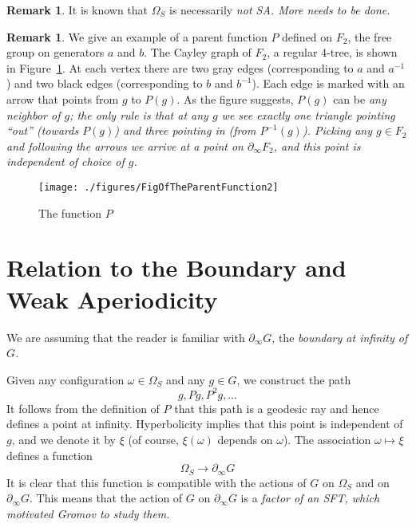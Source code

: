 \documentclass[12pt,reqno]{amsart}
\theoremstyle{plain}
\theoremstyle{definition}
\numberwithin{subcase}{case}
\theoremstyle{plain}
\theoremstyle{definition}
\newtheorem{remark}[thm]{Remark}
\begin{document}
\begin{remark}
\label{remark_notSA}
It is known that \(\Omega_{S}\) is necessarily \em not \em SA. More needs to be done.
\end{remark}


\begin{remark}
We give an example of a parent function \(P\) defined on \(F_{2}\), the free group on  generators \(a\) and \(b\). The Cayley graph of \(F_{2}\), a regular 4-tree, is shown in Figure~\ref{figure:papas}. 
At each vertex there are two gray edges (corresponding to \(a\) and \(a^{-1}\)) and  two black edges (corresponding to \(b\) and \(b^{-1}\)). Each edge is marked with an arrow that points from \(g\) to \(P(g)\).
As the figure suggests, \(P(g)\) can be \em any \em neighbor of \(g\); the only rule is that at any \(g\) we see exactly one triangle pointing ``out'' (towards \(P(g)\)) and three pointing in (from \(P^{-1}(g)\)). Picking any \(g \in F_{2}\) and following the arrows we arrive at a point on \(\partial_{\infty} F_{2}\), and this point is independent of choice of \(g\). 
\begin{figure}
\centerline{{\texttt{[image: ./figures/FigOfTheParentFunction2]}}}
\caption{The function \(P\)}
\label{figure:papas}
\end{figure}
\end{remark}





\section{Relation to the Boundary and Weak Aperiodicity}
\label{section:boundary_WA}

We are assuming that the reader is familiar with \(\partial_{\infty} G\), the \em boundary at infinity \em of \(G\).  

Given any configuration \(\omega \in \Omega_{S}\) and any \(g \in G\), we construct the path
\[
g, Pg, P^{2}g,\dots
\]
It follows from the definition of \(P\) that this path is a geodesic ray and hence defines a point at infinity. Hyperbolicity  implies that this point is independent of \(g\), and we denote it by \(\xi\) (of course, \(\xi(\omega)\) depends on \(\omega\)). The association \(\omega \mapsto \xi\) defines a function
\[
\Omega_{S} \to \partial_{\infty} G
\]
It is clear that this function is compatible with the actions of \(G\) on \(\Omega_{S}\) and on \(\partial_{\infty} G\). This means that the action of \(G\) on \(\partial_{\infty} G\) is a \em factor \em of an SFT, which motivated Gromov to study them.
\end{document}

